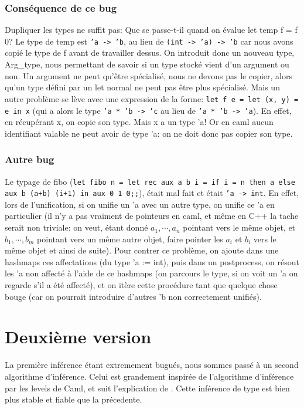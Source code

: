\documentclass[paper=a4, fontsize=11pt, twocolumn]{article}
\begin{document}
\subsubsection{Conséquence de ce bug}
Dupliquer les types ne suffit pas: Que se passe-t-il quand on évalue let temp f = f 0? Le type de temp est \texttt{'a -> 'b}, au lieu de \texttt{(int -> 'a) -> 'b} car nous avons copié le type de f avant de travailler dessus. On introduit donc un nouveau type, Arg\_type, nous permettant de savoir si un type stocké vient d'un argument ou non. Un argument ne peut qu'être spécialisé, nous ne devons pas le copier, alors qu'un type défini par un let normal ne peut pas être plus spécialisé. 
Mais un autre problème se lève avec une expression de la forme: \texttt{let f e = let (x, y) = e in x} (qui a alors le type \texttt{'a * 'b -> 'c} au lieu de \texttt{'a * 'b -> 'a}). En effet, en récupérant x, on copie son type. Mais x a un type 'a! Or en caml aucun identifiant valable ne peut avoir de type 'a: on ne doit donc pas copier son type.
\subsubsection{Autre bug}
Le typage de fibo (\texttt{let fibo n = let rec aux a b i = if i = n then a else aux b (a+b) (i+1) in aux 0 1 0;;}), était mal fait et était \texttt{'a -> int}. En effet, lors de l'unification, si on unifie un 'a avec un autre type, on unifie ce 'a en particulier (il n'y a pas vraiment de pointeurs en caml, et même en C++ la tache serait non triviale: on veut, étant donné $a_1,\cdots,a_n$ pointant vers le même objet, et $b_1, \cdots, b_m $ pointant vers un même autre objet, faire pointer les $a_i$ et $b_i$ vers le même objet et ainsi de suite). Pour contrer ce problème, on ajoute dans une hashmaps ces affectations (du type 'a := int), puis dans un postprocess, on résout les 'a non affecté à l'aide de ce hashmaps (on parcours le type, si on voit un 'a on regarde s'il a été affecté), et on itère cette procédure tant que quelque chose bouge (car on pourrait introduire d'autres 'b non correctement unifiés).

\section{Deuxième version}
La première inférence étant extremement bugués, nous sommes passé à un second algorithme d'inférence. Celui est grandement inspirée de l'algorithme d'inférence par les levels de Caml, et suit l'explication de \cite{Type}. Cette inférence de type est bien plus stable et fiable que la précedente.
\end{document}
